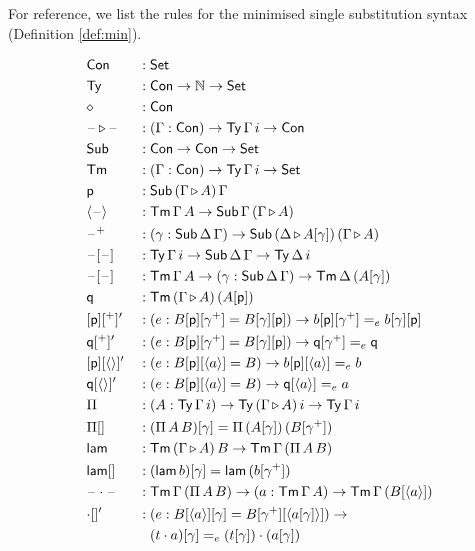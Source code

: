 \documentclass[submission,copyright,creativecommons]{eptcs}
\newcommand{\ra}{\rightarrow}
\newcommand{\Set}{\mathsf{Set}}
\newcommand{\Ty}{\mathsf{Ty}}
\newcommand{\Tm}{\mathsf{Tm}}
\newcommand{\Con}{\mathsf{Con}}
\newcommand{\Sub}{\mathsf{Sub}}
\newcommand{\p}{\mathsf{p}}
\newcommand{\q}{\mathsf{q}}
\newcommand{\ext}{\mathop{\triangleright}}
\newcommand{\N}{\mathbb{N}}
\newcommand{\lam}{\mathsf{lam}}
\newcommand{\blank}{\mathord{\hspace{1pt}\text{--}\hspace{1pt}}} %
\begin{document}
For reference, we list the rules for the minimised single substitution
syntax (Definition \ref{def:min}). \\
\begin{minipage}{0.6\textwidth}
\begin{alignat*}{10}
  & \Con && : \Set \\
  & \Ty && : \Con\ra\N\ra\Set \\
  & \diamond && : \Con \\
  & \blank\ext\blank && : (\Gamma:\Con)\ra\Ty\,\Gamma\,i\ra\Con \\
  & \Sub && : \Con\ra\Con\ra\Set \\
  & \Tm && : (\Gamma:\Con)\ra\Ty\,\Gamma\,i\ra\Set \\
  & \p && : \Sub\,(\Gamma\ext A)\,\Gamma \\
  & \langle\blank\rangle && : \Tm\,\Gamma\,A\ra\Sub\,\Gamma\,(\Gamma\ext A) \\
  & \blank^+ && : (\gamma:\Sub\,\Delta\,\Gamma)\ra\Sub\,(\Delta\ext A[\gamma])\,(\Gamma\ext A) \\
  & \blank[\blank] && : \Ty\,\Gamma\,i\ra\Sub\,\Delta\,\Gamma\ra\Ty\,\Delta\,i \\
  & \blank[\blank] && : \Tm\,\Gamma\,A\ra(\gamma:\Sub\,\Delta\,\Gamma)\ra\Tm\,\Delta\,(A[\gamma]) \\
  & \q && : \Tm\,(\Gamma\ext A)\,(A[\p]) \\
  & [\p][^+]' && : (e:B[\p][\gamma^+] = B[\gamma][\p])\ra b[\p][\gamma^+] =_e b[\gamma][\p] \\
  & \q[^+]' && : (e:B[\p][\gamma^+] = B[\gamma][\p])\ra \q[\gamma^+] =_e \q \\
  & [\p][\langle\rangle]' && : (e:B[\p][\langle a\rangle] = B)\ra b[\p ][\langle a\rangle] =_e b \\
  & \q[\langle\rangle]' && : (e:B[\p][\langle a\rangle] = B)\ra \q[\langle a\rangle] =_e a \\
  & \Pi && : (A:\Ty\,\Gamma\,i)\ra\Ty\,(\Gamma\ext A)\,i\ra\Ty\,\Gamma\,i \\
  & \Pi[] && : (\Pi\,A\,B)[\gamma] = \Pi\,(A[\gamma])\,(B[\gamma^+]) \\
  & \lam && : \Tm\,(\Gamma\ext A)\,B\ra\Tm\,\Gamma\,(\Pi\,A\,B) \\
  & \lam[] && : (\lam\,b)[\gamma] = \lam\,(b[\gamma^+]) \\
  & \blank\cdot\blank && : \Tm\,\Gamma\,(\Pi\,A\,B)\ra(a:\Tm\,\Gamma\,A)\ra\Tm\,\Gamma\,(B[\langle a\rangle]) \\
  & {\cdot}[]' && : (e:B[\langle a\rangle][\gamma] = B[\gamma^+][\langle a[\gamma]\rangle])\ra \\
  & && \hphantom{{}:{}} (t\cdot a)[\gamma] =_e (t[\gamma])\cdot(a[\gamma]) \\
\end{alignat*}
\end{minipage}
\end{document}
